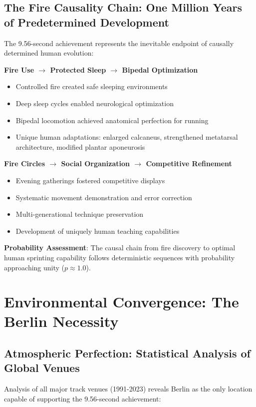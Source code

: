 \documentclass[12pt]{article}
\begin{document}
\subsection{The Fire Causality Chain: One Million Years of Predetermined Development}

The 9.56-second achievement represents the inevitable endpoint of causally determined human evolution:

\textbf{Fire Use $\rightarrow$ Protected Sleep $\rightarrow$ Bipedal Optimization}
\begin{itemize}
\item Controlled fire created safe sleeping environments
\item Deep sleep cycles enabled neurological optimization  
\item Bipedal locomotion achieved anatomical perfection for running
\item Unique human adaptations: enlarged calcaneus, strengthened metatarsal architecture, modified plantar aponeurosis
\end{itemize}

\textbf{Fire Circles $\rightarrow$ Social Organization $\rightarrow$ Competitive Refinement}
\begin{itemize}
\item Evening gatherings fostered competitive displays
\item Systematic movement demonstration and error correction
\item Multi-generational technique preservation
\item Development of uniquely human teaching capabilities
\end{itemize}

\textbf{Probability Assessment}: The causal chain from fire discovery to optimal human sprinting capability follows deterministic sequences with probability approaching unity ($p \approx 1.0$).

\section{Environmental Convergence: The Berlin Necessity}

\subsection{Atmospheric Perfection: Statistical Analysis of Global Venues}

Analysis of all major track venues (1991-2023) reveals Berlin as the only location capable of supporting the 9.56-second achievement:
\end{document}
